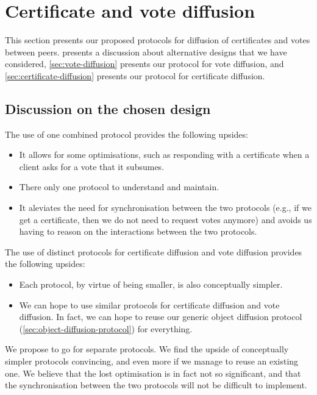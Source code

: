 \section{Certificate and vote diffusion}

This section presents our proposed protocols for diffusion of certificates and
votes between peers.  presents a
discussion about alternative designs that we have considered,
\cref{sec:vote-diffusion} presents our protocol for vote diffusion, and
\cref{sec:certificate-diffusion} presents our protocol for certificate
diffusion.

\subsection{Discussion on the chosen design}%
\label{sec:cert-vote-diff-discussion}


The use of one combined protocol provides the following upsides:
%
\begin{itemize}
\item It allows for some optimisations, such as responding with a certificate
  when a client asks for a vote that it subsumes.

\item There only one protocol to understand and maintain.

\item It aleviates the need for synchronisation between the two protocols (e.g.,
  if we get a certificate, then we do not need to request votes anymore) and
  avoids us having to reason on the interactions between the two protocols.
\end{itemize}

The use of distinct protocols for certificate diffusion and vote diffusion
provides the following upsides:

\begin{itemize}
\item Each protocol, by virtue of being smaller, is also conceptually simpler.

\item We can hope to use similar protocols for certificate diffusion and vote
  diffusion. In fact, we can hope to reuse our generic object diffusion protocol
  (\cref{sec:object-diffusion-protocol}) for everything.
\end{itemize}

We propose to go for separate protocols. We find the upside of conceptually
simpler protocols convincing, and even more if we manage to reuse an existing
one. We believe that the lost optimisation is in fact not so significant, and
that the synchronisation between the two protocols will not be difficult to
implement.

